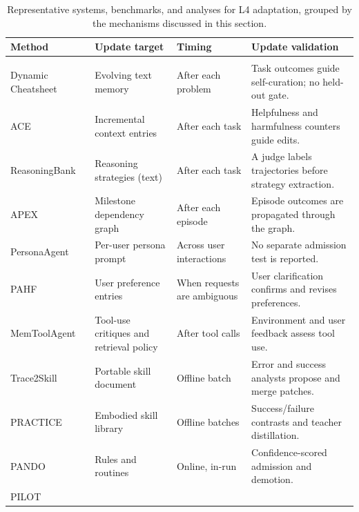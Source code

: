 \begin{table}[t]
\centering
\caption{Representative systems, benchmarks, and analyses for L4 adaptation, grouped by the mechanisms discussed in this section.}
\label{tab:l4-adaptation-summary}
\scriptsize
\setlength{\tabcolsep}{3pt}
\renewcommand{\arraystretch}{1.12}
\begin{tabularx}{\textwidth}{@{}>{\raggedright\arraybackslash}p{}>{\raggedright\arraybackslash}p{}>{\raggedright\arraybackslash}p{}>{\raggedright\arraybackslash}X@{}}
\toprule
\textbf{Method} & \textbf{Update target} & \textbf{Timing} & \textbf{Update validation} \\
\midrule
\multicolumn{4}{@{}l}{\textbf{Trajectory distillation}} \\
Dynamic Cheatsheet~\cite{suzgun2026dynamic}
& Evolving text memory
& After each problem
& Task outcomes guide self-curation; no held-out gate. \\
ACE~\cite{zhang2026agentic}
& Incremental context entries
& After each task
& Helpfulness and harmfulness counters guide edits. \\
ReasoningBank~\cite{ouyang2026reasoningbank}
& Reasoning strategies (text)
& After each task
& A judge labels trajectories before strategy extraction. \\
APEX~\cite{li2026apex}
& Milestone dependency graph
& After each episode
& Episode outcomes are propagated through the graph. \\
PersonaAgent~\cite{zhang2026personaagent}
& Per-user persona prompt
& Across user interactions
& No separate admission test is reported. \\
PAHF~\cite{liang2026learning}
& User preference entries
& When requests are ambiguous
& User clarification confirms and revises preferences. \\
MemToolAgent~\cite{er2026memtoolagent}
& Tool-use critiques and retrieval policy
& After tool calls
& Environment and user feedback assess tool use. \\
Trace2Skill~\cite{ni2026trace2skill}
& Portable skill document
& Offline batch
& Error and success analysts propose and merge patches. \\
PRACTICE~\cite{bai2026practice}
& Embodied skill library
& Offline batches
& Success/failure contrasts and teacher distillation. \\
PANDO~\cite{li2026pando}
& Rules and routines
& Online, in-run
& Confidence-scored admission and demotion. \\
PILOT~\cite{xiao2026pilot}

\end{tabularx}
\end{table}
